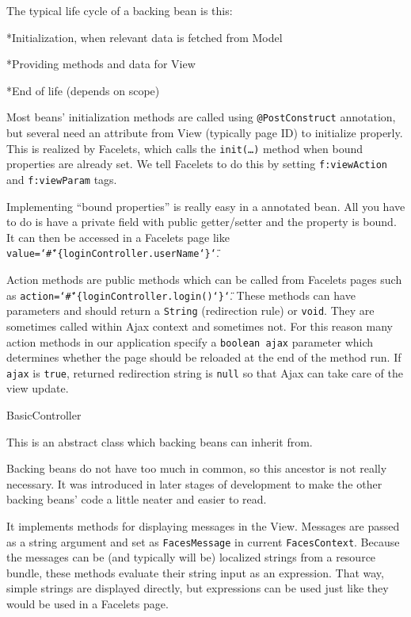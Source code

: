The typical life cycle of a backing bean is this:

\begitems

*Initialization, when relevant data is fetched from Model

*Providing methods and data for View

*End of life (depends on scope)

\enditems

Most beans’ initialization methods are called using {\tt @PostConstruct} annotation, but several need an attribute from View (typically page ID) to initialize properly. This is realized by Facelets, which calls the {\tt init(…)} method when bound properties are already set. We tell Facelets to do this by setting {\tt f:viewAction} and {\tt f:viewParam} tags.

Implementing “bound properties” is really easy in a  annotated bean. All you have to do is have a private field with public getter/setter and the property is bound. It can then be accessed in a Facelets page like {\tt value=\char`\"\#\char`\{loginController.userName\char`\}\char`\"}.

Action methods are public methods which can be called from Facelets pages such as {\tt action=\char`\"\#\char`\{loginController.login()\char`\}\char`\"}. These methods can have parameters and should return a {\tt String} (redirection rule) or {\tt void}. They are sometimes called within Ajax context and sometimes not. For this reason many action methods in our application specify a {\tt boolean ajax} parameter which determines whether the page should be reloaded at the end of the method run. If {\tt ajax} is {\tt true}, returned redirection string is {\tt null} so that Ajax can take care of the view update.

\secc BasicController

This is an abstract class which backing beans can inherit from.

Backing beans do not have too much in common, so this ancestor is not really necessary. It was introduced in later stages of development to make the other backing beans’ code a little neater and easier to read.

It implements methods for displaying messages in the View. Messages are passed as a string argument and set as {\tt FacesMessage} in current {\tt FacesContext}. Because the messages can be (and typically will be) localized strings from a resource bundle, these methods evaluate their string input as an  expression. That way, simple strings are displayed directly, but  expressions can be used just like they would be used in a Facelets page.

